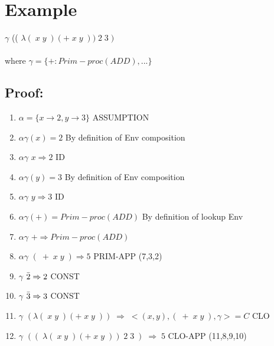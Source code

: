 \vspace{2cm}

\section{Example}
$\gamma$ \textbar\; ((\; $\lambda (\; x \; y \;) ( + \; x \; y\;))\; 2 \; 3\;)$ 
\\ \\ where\; $\gamma = \{ + : Prim-proc(ADD), . . . \}$

\subsection{Proof:} 
\begin{enumerate}
  \item $\alpha = \{ x \rightarrow 2, y \rightarrow 3 \}$ \hspace{1cm} ASSUMPTION
  \item $\alpha \gamma (x) = 2$ \hspace{1cm} By definition of Env composition
  \item $\alpha \gamma$ \textbar\; $x \Rightarrow 2$ \hspace{1cm} ID
  \item $\alpha \gamma (y) = 3$ \hspace{1cm} By definition of Env composition
  \item $\alpha \gamma$ \textbar\; $y \Rightarrow 3$ \hspace{1cm} ID
  \item $\alpha \gamma (+) = Prim-proc(ADD)$ \hspace{1cm} By definition of lookup Env
  \item $\alpha \gamma$ \textbar\; $+ \Rightarrow Prim-proc(ADD)$
  \item $\alpha \gamma$ \textbar\; $(\; + \; x \; y\;) \Rightarrow 5$ \hspace{1cm} PRIM-APP (7,3,2)
  \item $\gamma$ \textbar\; $\Bar{2} \Rightarrow 2$ \hspace{1cm} CONST
  \item $\gamma$ \textbar\; $\Bar{3} \Rightarrow 3$ \hspace{1cm} CONST
  \item $\gamma$ \textbar\; $(\lambda (\; x \; y \;) ( + \; x \; y\;))\; \Rightarrow\; <(x,y),(\;+ \; x \; y \;), \gamma> = C$ \hspace{5mm} CLO
  \item $\gamma$ \textbar\; $((\;\lambda (\; x \; y \;) ( + \; x \; y\;))\; 2 \; 3\;)\; \Rightarrow\; 5$ \hspace{5mm} CLO-APP (11,8,9,10)
\end{enumerate}




